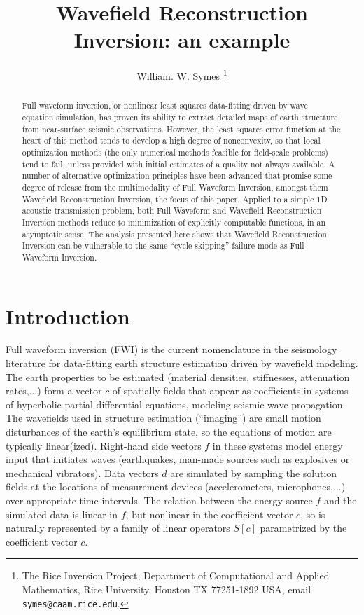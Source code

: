 \title{Wavefield Reconstruction Inversion: an example}
\author{William. W. Symes \thanks{The Rice Inversion Project,
Department of Computational and Applied Mathematics, Rice University,
Houston TX 77251-1892 USA, email {\tt symes@caam.rice.edu}.}}



\begin{abstract}
  Full waveform inversion, or nonlinear least squares data-fitting
  driven by wave equation simulation, has proven its ability to
  extract detailed maps of earth structture from near-surface seismic
  observations. However, the least squares error function at the heart
  of this method tends to develop a high degree of nonconvexity, so
  that local optimization methods (the only numerical methods feasible
  for field-scale problems) tend to fail, unless provided with initial
  estimates of a quality not always available. A number of alternative
  optimization principles have been advanced that promise some degree
  of release from the multimodality of Full Waveform Inversion,
  amongst them Wavefield Reconstruction Inversion, the focus of this
  paper. Applied to a simple 1D acoustic transmission problem, both
  Full Waveform and Wavefield Reconstruction Inversion methods reduce
  to minimization of explicitly computable functions, in an asymptotic
  sense. The analysis presented here shows that Wavefield
  Reconstruction Inversion can be vulnerable to the same
  ``cycle-skipping'' failure mode as Full Waveform Inversion.
\end{abstract}

\section{Introduction}

Full waveform inversion (FWI) is the current nomenclature in the
seismology literature for data-fitting earth structure estimation
driven by wavefield modeling. The earth properties to be estimated
(material densities, stiffnesses, attenuation rates,...) form a vector
$c$ of spatially fields that appear as coefficients in systems of hyperbolic
partial differential equations, modeling seismic wave
propagation. The wavefields used in structure estimation (``imaging'')
are small motion disturbances of the earth's equilibrium state, so the
equations of motion are typically 
linear(ized). Right-hand side vectors $f$ in these systems model energy
input that initiates waves (earthquakes, man-made sources such as
explosives or mechanical vibrators). Data vectors $d$ are simulated by
sampling the solution fields at the locations of measurement devices
(accelerometers, microphones,...)  over appropriate time
intervals. The relation between the energy source $f$ and the
simulated data is linear in $f$, but nonlinear in the coefficient
vector $c$, so is naturally represented by a family of linear
operators $S[c]$ parametrized by the coefficient vector $c$.

